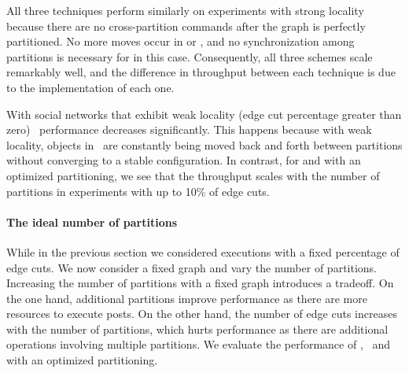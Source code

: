 All three techniques perform similarly on experiments with
strong locality because there are no cross-partition commands after
the graph is perfectly partitioned. No more moves occur in
\dynastar or \dssmr, and no synchronization among partitions is
necessary for \ssmr in this case. 
Consequently, all three schemes scale remarkably well, and
the difference in throughput between each technique is due to the implementation of each one.

With social networks that exhibit weak locality (edge cut percentage greater than zero) \dssmr\ performance decreases significantly.  
This happens because with weak locality, objects in \dssmr\ are constantly being moved back and forth between partitions 
without converging to a stable configuration.
In contrast, for \dynastar and \ssmr with an optimized partitioning, we see that the throughput scales with the number of partitions in experiments with up to 10\% of edge cuts. 



\paragraph*{The ideal number of partitions}
\label{sec:evaluation:results}

While in the previous section we considered executions with a fixed percentage of edge cuts.
We now consider a fixed graph and vary the number of partitions.
Increasing the number of partitions with a fixed graph introduces a tradeoff.
On the one hand, additional partitions improve performance as there are more resources to execute posts.
On the other hand, the number of edge cuts increases with the number of partitions, which hurts performance as there are additional operations involving multiple partitions.
We evaluate the performance of \dynastar, \dssmr\ and \ssmr with an optimized partitioning.%

